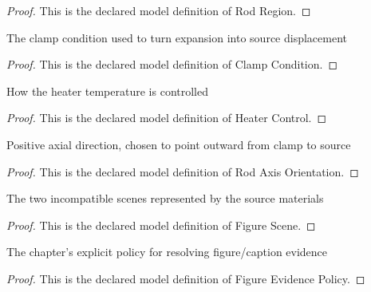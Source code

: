 \begin{proof}
  This is the declared model definition of Rod Region.
\end{proof}
\begin{definition}
  \label{def:physics:phyx-mini-0156:phyxminiproblems-problemphyxmini0156-clampcondition}
  The clamp condition used to turn expansion into source displacement
\end{definition}
\begin{proof}
  This is the declared model definition of Clamp Condition.
\end{proof}
\begin{definition}
  \label{def:physics:phyx-mini-0156:phyxminiproblems-problemphyxmini0156-heatercontrol}
  How the heater temperature is controlled
\end{definition}
\begin{proof}
  This is the declared model definition of Heater Control.
\end{proof}
\begin{definition}
  \label{def:physics:phyx-mini-0156:phyxminiproblems-problemphyxmini0156-rodaxisorientation}
  Positive axial direction, chosen to point outward from clamp to source
\end{definition}
\begin{proof}
  This is the declared model definition of Rod Axis Orientation.
\end{proof}
\begin{definition}
  \label{def:physics:phyx-mini-0156:phyxminiproblems-problemphyxmini0156-figurescene}
  The two incompatible scenes represented by the source materials
\end{definition}
\begin{proof}
  This is the declared model definition of Figure Scene.
\end{proof}
\begin{definition}
  \label{def:physics:phyx-mini-0156:phyxminiproblems-problemphyxmini0156-figureevidencepolicy}
  The chapter's explicit policy for resolving figure/caption evidence
\end{definition}
\begin{proof}
  This is the declared model definition of Figure Evidence Policy.
\end{proof}

